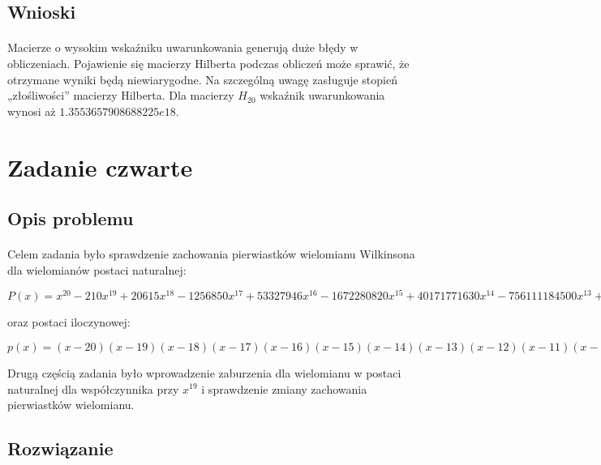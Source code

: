 \documentclass[a4paper]{article}
\begin{document}
\subsection{Wnioski}
\paragraph{}
Macierze o wysokim wskaźniku uwarunkowania generują duże błędy w obliczeniach. Pojawienie się macierzy Hilberta podczas obliczeń może sprawić, że otrzymane wyniki będą niewiarygodne. Na szczególną uwagę zasługuje stopień „złośliwości” macierzy Hilberta. Dla macierzy $H_{20}$ wskaźnik uwarunkowania wynosi aż $1.3553657908688225e18$.
\section{Zadanie czwarte}

\subsection{Opis problemu}
\paragraph{}
Celem zadania było sprawdzenie zachowania pierwiastków wielomianu Wilkinsona dla wielomianów postaci naturalnej:

\begin{center}
$P(x) = x^{20} - 210x^{19} + 20615x^{18} - 1256850x^{17} + 53327946x^{16} - 1672280820x^{15} + 40171771630x^{14} - 756111184500x^{13} + 11310276995381x^{12} - 135585182899530x^{11} + 1307535010540395x^{10} - 10142299865511450x^9 + 63030812099294896x^8 - 311333643161390640x^7 + 1206647803780373360x^6 - 3599979517947607200x^5 + 8037811822645051776x^4 - 12870931245150988800x^3 + 13803759753640704000x^2 - 8752948036761600000x + 2432902008176640000$
\end{center}
oraz postaci iloczynowej:
\begin{center}
$p(x) = (x - 20)(x - 19)(x - 18)(x - 17)(x - 16)(x - 15)(x - 14)(x - 13)(x - 12)(x - 11)(x - 10)(x - 9)(x - 8)(x - 7)(x - 6)(x - 5)(x - 4)(x - 3)(x - 2)(x - 1)$
\end{center}

Drugą częścią zadania było wprowadzenie zaburzenia dla wielomianu w postaci naturalnej dla współczynnika przy $x^{19}$ i sprawdzenie zmiany zachowania pierwiastków wielomianu.
\subsection{Rozwiązanie}
\end{document}
